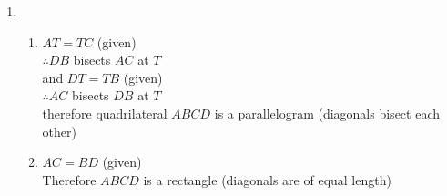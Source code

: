  \begin{solutions}{}{
\begin{enumerate}[itemsep=5pt, label=\textbf{\arabic*}. ] 


\item 
      \begin{enumerate}[noitemsep, label=\textbf{(\alph*)} ]
      \item 
$AT=TC$ (given)\\
$\therefore DB$ bisects $AC$ at $T$\\
and $DT=TB$ (given)\\
$\therefore AC$ bisects $DB$ at $T$\\
therefore quadrilateral $ABCD$ is a parallelogram (diagonals bisect each other)
      \item 
$AC=BD$ (given)\\
Therefore $ABCD$ is a rectangle (diagonals are of equal length)
      \end{enumerate}

\end{enumerate}}
\end{solutions}


